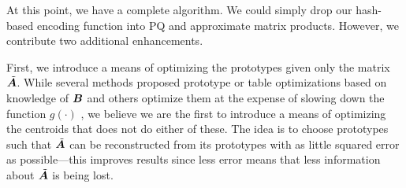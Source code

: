 At this point, we have a complete algorithm. We could simply drop our hash-based encoding function into PQ and approximate matrix products. However, we contribute two additional enhancements.

First, we introduce a means of optimizing the prototypes given only the matrix $\tilde{\bm{A}}$. While several methods proposed prototype or table optimizations based on knowledge of $\bm{B}$ \cite{pairq,optimizedDists} and others optimize them at the expense of slowing down the function $g(\cdot)$ \cite{cq,scq}, we believe we are the first to introduce a means of optimizing the centroids that does not do either of these. The idea is to choose prototypes such that $\tilde{\bm{A}}$ can be reconstructed from its prototypes with as little squared error as possible---this improves results since less error means that less information about $\tilde{\bm{A}}$ is being lost.

